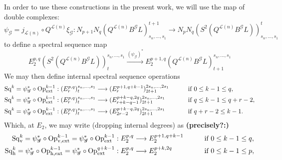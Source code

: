\documentclass[11pt]{amsart}
\theoremstyle{plain}
\theoremstyle{definition}
\renewcommand{\to}{\longrightarrow}
\newcommand{\scrG}{\mathscr{G}}
\newcommand{\calL}{\mathcal{L}}
\theoremstyle{plain}
\newcommand{\BSW}{{\scrG}}
\newcommand{\BSWres}{B^\BSW}%
\newcommand{\ExtCohOp}{\textup{Op}_\textup{ext}}
\newcommand{\vExtCohOp}{\textup{Op}_\textup{v,ext}}
\newcommand{\hExtCohOp}{\textup{Op}_\textup{h,ext}}
\newcommand{\Sq}{\mathrm{Sq}}
\begin{document}
\begin{Composite functor spectral sequences}
In order to use these constructions in the present work, we will use the map of double complexes:
\[\psi_{\BSW}=j_{\calL(n)}\circ Q^{\calL(n)}\xi_\BSW:N_{p+1}N_q(Q^{\calL(n)}\BSWres L)_{s_n,\ldots,s_1}^{t+1}\to N_{p}N_q(S^2(Q^{\calL(n)}\BSWres L))_{s_n,\ldots,s_1}^{t}\]
to define a spectral sequence map
\[E_2^{p,q}(S^2(Q^{\calL(n)}\BSWres L))^{s_n,\ldots,s_1}_t\overset{(\psi_\BSW)^*}{\to} E_2^{p+1,q}(Q^{\calL(n)}\BSWres L)^{s_n,\ldots,s_1}_{t+1}\]
We may then define internal spectral sequence operations
\begin{alignat*}{2}
\Sq^k=\psi_{\BSW}^*\circ\ExtCohOp^{k-1}:(E^{p,q}_r)^{s_n,\ldots,s_1}_t&\to (E^{p+1,q+k-1}_r)^{2s_n,\ldots,2s_1}_{2t+1}&\qquad&\text{if }0\leq k-1 \leq q,\\
\Sq^k=\psi_{\BSW}^*\circ\ExtCohOp^{k-1}:(E^{p,q}_r)^{s_n,\ldots,s_1}_t&\to (E^{p+k-q,2q}_{r+k-q-1})^{2s_n,\ldots,2s_1}_{2t+1}&\qquad&\text{if }q\leq k-1\leq q+r-2,\\
\Sq^k=\psi_{\BSW}^*\circ\ExtCohOp^{k-1}:(E^{p,q}_r)^{s_n,\ldots,s_1}_t&\to (E^{p+k-q,2q}_{2r-2})^{2s_n,\ldots,2s_1}_{2t+1}&\qquad&\text{if }q+r-2\leq k-1.
\end{alignat*}
Which, at $E_2$, we may write (dropping internal degrees) as \textbf{(precisely?:)}
\begin{alignat*}{2}
\Sq^k_\textup{v}=\psi_{\BSW}^*\circ\vExtCohOp^{k-1}= \psi_{\BSW}^*\circ\ExtCohOp^{k-1}:E^{p,q}_2&\to E^{p+1,q+k-1}_2&\qquad&\text{if }0\leq k-1 \leq q,\\
\Sq^k_\textup{h}=\psi_{\BSW}^*\circ\hExtCohOp^{k-1}= \psi_{\BSW}^*\circ\ExtCohOp^{q+k-1}:E^{p,q}_2&\to E^{p+k,2q}_2&\qquad&\text{if }0\leq k-1 \leq p,
\end{alignat*}


\end{Composite functor spectral sequences}
\end{document}
